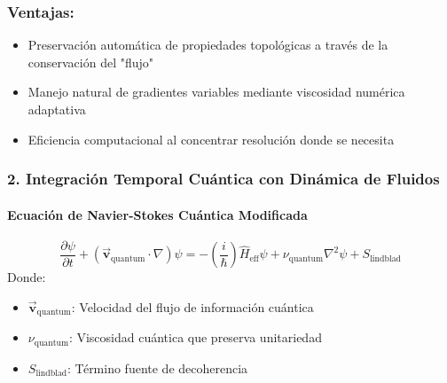 \documentclass{book}
\newcommand{\bvec}[1]{\vec{\mathbf{#1}}}
\begin{document}
\subsubsection*{Ventajas:}
\begin{itemize}
    \item Preservación automática de propiedades topológicas a través de la conservación del "flujo"
    \item Manejo natural de gradientes variables mediante viscosidad numérica adaptativa
    \item Eficiencia computacional al concentrar resolución donde se necesita
\end{itemize}
\subsubsection*{2. Integración Temporal Cuántica con Dinámica de Fluidos}
\paragraph*{Ecuación de Navier-Stokes Cuántica Modificada}
\begin{equation}
    \frac{\partial\psi}{\partial t} + (\bvec{v}_{\text{quantum}} \cdot \nabla)\psi = -\left(\frac{i}{\hbar}\right)\hat{H}_{\text{eff}} \psi + \nu_{\text{quantum}} \nabla^2\psi + S_{\text{lindblad}}
\end{equation}
Donde:
\begin{itemize}
    \item $\bvec{v}_{\text{quantum}}$: Velocidad del flujo de información cuántica
    \item $\nu_{\text{quantum}}$: Viscosidad cuántica que preserva unitariedad
    \item $S_{\text{lindblad}}$: Término fuente de decoherencia
\end{itemize}
\end{document}

